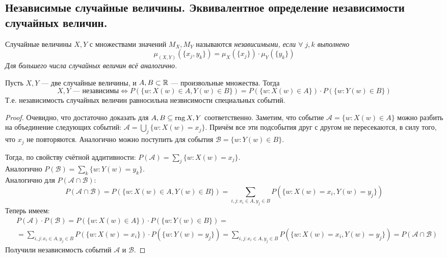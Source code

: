 \subsection{Независимые случайные величины. Эквивалентное определение независимости случайных величин.}
\begin{definition}
    Случайные величины $X, Y$ с множествами значений $M_X, M_Y$ называются \it{независимыми}, если
    $\forall\;j, k$ выполнено
    \[
        \mu_{(X, Y)}(\{x_j, y_k\}) = \mu_X(\{x_j\}) \cdot \mu_Y(\{y_k\})
    \]
    Для большего числа случайных величин всё аналогично.
\end{definition}
\begin{proposal}
    Пусть $X, Y$ --- две случайные величины, и $A, B \subset \mathbb{R}$ --- произвольные множества. Тогда
    \[
        X, Y \text{ --- независимы} \iff
        P(\{w \colon X(w) \in A, Y(w) \in B\}) = P(\{w \colon X(w) \in A\}) \cdot
        P(\{w \colon Y(w) \in B\})
    \]
    Т.е. независимость случайных величин равносильна незвисимости специальных событий.
\end{proposal}
\begin{proof}
    Очевидно, что достаточно доказать для $A, B \subseteq \operatorname{\mathop{\mathrm{rng}}} X, Y$ соответственно.
    Заметим, что событие $\mathcal{A} = \{w \colon X(w) \in A\}$ можно разбить на объединение следующих событий:
    $\mathcal{A} = \bigcup\limits_{j} \{w \colon X(w) = x_j\}$. Причём все эти подсобытия друг с другом не пересекаются,
    в силу того, что $x_j$ не повторяются. Аналогично можно поступить для события $\mathcal{B} = \{w \colon Y(w) \in B\}$.

    Тогда, по свойству счётной аддитивности: $P(\mathcal{A}) = \sum\limits_{j} \{w \colon X(w) = x_j\}$.\\
    Аналогично $P(\mathcal{B}) = \sum\limits_{k} \{w \colon Y(w) = y_k\}$.\\
    Аналогично для
    $P(\mathcal{A} \cap \mathcal{B})$:
    \[
        P(\mathcal{A} \cap \mathcal{B}) = P(\{w \colon X(w) \in A, Y(w) \in B\}) =
        \sum\limits_{i, j \colon x_i \in A, y_j \in B} P(\{w \colon X(w) = x_i, Y(w) = y_j\})
    \]
    Теперь имеем:
    \begin{align*}
        &P(\mathcal{A}) \cdot P(\mathcal{B}) =
        P(\{w \colon X(w) \in A\}) \cdot P(\{w \colon Y(w) \in B\}) =\\
        &=\sum\limits_{i, j \colon x_i \in A, y_j \in B}
        P(\{w \colon X(w) = x_i\}) \cdot P(\{w \colon Y(w) = y_j\})
        =\sum\limits_{i, j \colon x_i \in A, y_j \in B} P(\{w \colon X(w) = x_i, Y(w) = y_j\})
        =P(\mathcal{A} \cap \mathcal{B})
    \end{align*}
    Получили независимость событий $\mathcal{A}$ и $\mathcal{B}$.
\end{proof}
